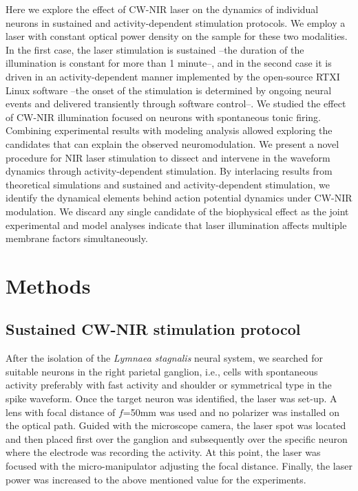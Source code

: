 Here we explore the effect of CW-NIR laser on the dynamics of individual neurons in sustained and activity-dependent stimulation protocols. We employ a laser with constant optical power density on the sample for these two modalities. In the first case, the laser stimulation is sustained --the duration of the illumination is constant for more than 1 minute--, and in the second case it is driven in an activity-dependent manner implemented by the open-source RTXI\parencite{patel_hard_2017} Linux software --the onset of the stimulation is determined by ongoing neural events and delivered transiently through software control--.
We studied the effect of CW-NIR illumination focused on neurons with spontaneous tonic firing. Combining experimental results with modeling analysis allowed exploring the candidates that can explain the observed neuromodulation. We present a novel procedure for NIR laser stimulation to dissect and intervene in the waveform dynamics through activity-dependent stimulation. By interlacing results from theoretical simulations and sustained and activity-dependent stimulation, we identify the dynamical elements behind action potential dynamics under CW-NIR modulation. We discard any single candidate of the biophysical effect as the joint experimental and model analyses indicate that laser illumination affects multiple membrane factors simultaneously.




\section{Methods}
%

\subsection{Sustained CW-NIR stimulation protocol}
\label{sect:sustained-protocol}
After the isolation of the \textit{Lymnaea stagnalis} neural system, we searched for suitable neurons in the right parietal ganglion, i.e., cells with spontaneous activity preferably with fast activity and shoulder or symmetrical type in the spike waveform. 
Once the target neuron was identified, the laser was set-up. A lens with focal distance of $f$=50mm was used and no polarizer was installed on the optical path. Guided with the microscope camera, the laser spot was located and then placed first over the ganglion and subsequently over the specific neuron where the electrode was recording the activity. 
At this point, the laser was focused with the micro-manipulator adjusting the focal distance. Finally, the laser power was increased to the above mentioned value for the experiments.

